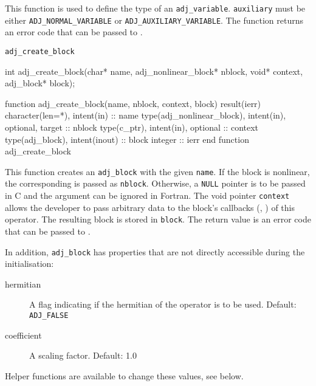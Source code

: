 This function is used to define the type of an \texttt{adj_variable}.
\texttt{auxiliary} must be either \texttt{ADJ_NORMAL_VARIABLE} or \texttt{ADJ_AUXILIARY_VARIABLE}.
The function returns an error code that can be passed to .


\begin{boxwithtitle}{\texttt{adj_create_block}}
\begin{minipage}{\columnwidth}
\begin{ccode}
  int adj_create_block(char* name, adj_nonlinear_block* nblock, void* context, 
                       adj_block* block);
\end{ccode}
\begin{fortrancode}
  function adj_create_block(name, nblock, context, block) result(ierr)
    character(len=*), intent(in) :: name
    type(adj_nonlinear_block), intent(in), optional, target :: nblock
    type(c_ptr), intent(in), optional :: context
    type(adj_block), intent(inout) :: block
    integer :: ierr
  end function adj_create_block
\end{fortrancode}
\end{minipage}
\end{boxwithtitle}

This function creates an \texttt{adj_block} with the given \texttt{name}.
If the block is nonlinear, the corresponding  is passed as \texttt{nblock}. 
Otherwise, a \texttt{NULL} pointer is to be passed in C and the argument can be ignored in Fortran.
The void pointer \texttt{context} allows the developer to pass arbitrary data to the block's callbacks (, ) of this operator. 
The resulting block is stored in \texttt{block}. 
The return value is an error code that can be passed to .

In addition, \texttt{adj_block} has properties that are not directly accessible during the initialisation:

\begin{description}
  \item[hermitian] A flag indicating if the hermitian of the operator is to be used. Default: \texttt{ADJ_FALSE}
  \item[coefficient] A scaling factor. Default: 1.0
\end{description}

Helper functions are available to change these values, see below. 


